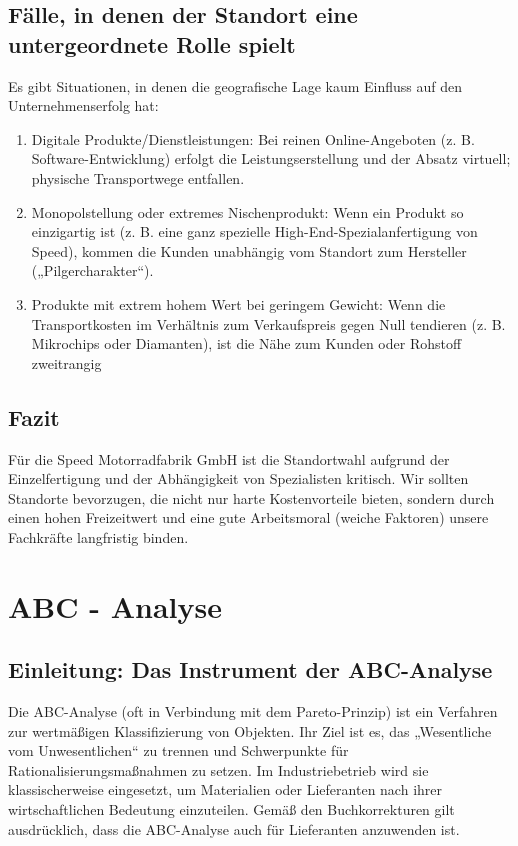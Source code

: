\documentclass[12pt, a4paper]{article}
\begin{document}
\subsection{Fälle, in denen der Standort eine untergeordnete Rolle spielt}
Es gibt Situationen, in denen die geografische Lage kaum Einfluss auf den Unternehmenserfolg hat:
\begin{enumerate}
    \item Digitale Produkte/Dienstleistungen: Bei reinen Online-Angeboten (z. B. Software-Entwicklung) erfolgt die Leistungserstellung und der Absatz virtuell; physische Transportwege entfallen.
    \item Monopolstellung oder extremes Nischenprodukt: Wenn ein Produkt so einzigartig ist (z. B. eine ganz spezielle High-End-Spezialanfertigung von Speed), kommen die Kunden unabhängig vom Standort zum Hersteller („Pilgercharakter“).
    \item Produkte mit extrem hohem Wert bei geringem Gewicht: Wenn die Transportkosten im Verhältnis zum Verkaufspreis gegen Null tendieren (z. B. Mikrochips oder Diamanten), ist die Nähe zum Kunden oder Rohstoff zweitrangig
\end{enumerate}

\subsection{Fazit}
Für die Speed Motorradfabrik GmbH ist die Standortwahl aufgrund der Einzelfertigung und der 
Abhängigkeit von Spezialisten kritisch. Wir sollten Standorte bevorzugen, die nicht nur
harte Kostenvorteile bieten, sondern durch einen hohen Freizeitwert und eine gute Arbeitsmoral 
(weiche Faktoren) unsere Fachkräfte langfristig binden.
\newpage

\section{ABC - Analyse}
\subsection{Einleitung: Das Instrument der ABC-Analyse}
Die ABC-Analyse (oft in Verbindung mit dem Pareto-Prinzip) ist ein Verfahren 
zur wertmäßigen Klassifizierung von Objekten. Ihr Ziel ist es, das „Wesentliche 
vom Unwesentlichen“ zu trennen und Schwerpunkte für Rationalisierungsmaßnahmen zu setzen. 
Im Industriebetrieb wird sie klassischerweise eingesetzt, um Materialien oder Lieferanten 
nach ihrer wirtschaftlichen Bedeutung einzuteilen. Gemäß den Buchkorrekturen gilt ausdrücklich, 
dass die ABC-Analyse auch für Lieferanten anzuwenden ist.
\end{document}

